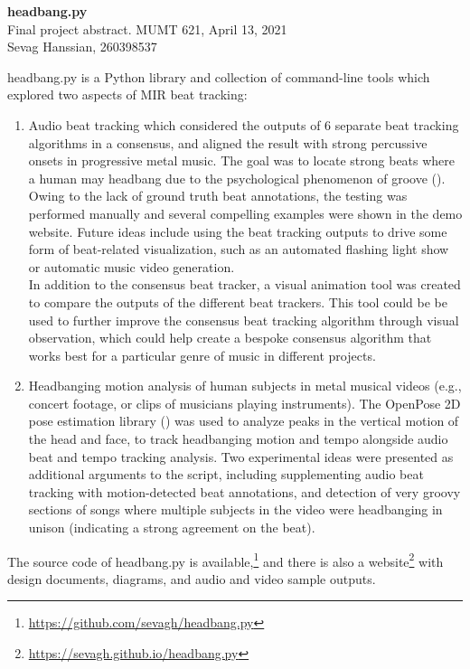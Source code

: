 \documentclass[letter,12pt]{report}
\begin{document}
\noindent\Large{\textbf{headbang.py}}\\
\large{Final project abstract. MUMT 621, April 13, 2021}\\
\large{Sevag Hanssian, 260398537}

\noindent\hrulefill

\vspace{2em}

headbang.py is a Python library and collection of command-line tools which explored two aspects of MIR beat tracking:

\begin{enumerate}
	\item
		Audio beat tracking which considered the outputs of 6 separate beat tracking algorithms in a consensus, and aligned the result with strong percussive onsets in progressive metal music. The goal was to locate strong beats where a human may headbang due to the psychological phenomenon of groove (\cite{groove}). Owing to the lack of ground truth beat annotations, the testing was performed manually and several compelling examples were shown in the demo website. Future ideas include using the beat tracking outputs to drive some form of beat-related visualization, such as an automated flashing light show or automatic music video generation.\\

		\vspace{-0.5em}
		In addition to the consensus beat tracker, a visual animation tool was created to compare the outputs of the different beat trackers. This tool could be be used to further improve the consensus beat tracking algorithm through visual observation, which could help create a bespoke consensus algorithm that works best for a particular genre of music in different projects.
	\item
		Headbanging motion analysis of human subjects in metal musical videos (e.g., concert footage, or clips of musicians playing instruments). The OpenPose 2D pose estimation library (\cite{openpose}) was used to analyze peaks in the vertical motion of the head and face, to track headbanging motion and tempo alongside audio beat and tempo tracking analysis. Two experimental ideas were presented as additional arguments to the script, including supplementing audio beat tracking with motion-detected beat annotations, and detection of very groovy sections of songs where multiple subjects in the video were headbanging in unison (indicating a strong agreement on the beat).
\end{enumerate}

The source code of headbang.py is available,\footnote{\url{https://github.com/sevagh/headbang.py}} and there is also a website\footnote{\url{https://sevagh.github.io/headbang.py}} with design documents, diagrams, and audio and video sample outputs.

\vfill
\clearpage

\nocite{*}
\printbibheading[title={\vspace{-3.5em}References},heading=bibnumbered]
\vspace{-1.5em}
\printbibliography[heading=none]
\end{document}
